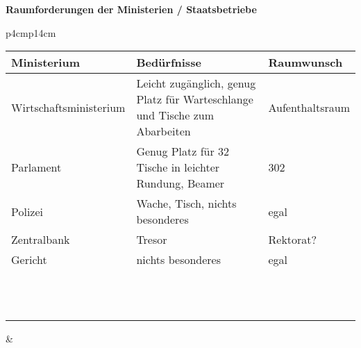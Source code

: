 \documentclass[12pt]{article}
\begin{document}
\textbf{\LARGE{Raumforderungen der Ministerien / Staatsbetriebe}}

\renewcommand{\arraystretch}{1.5}

\vspace{5mm}
\begin{tabular}{p{4cm}p{14cm}}
    \begin{tabular}{|p{}|p{}|p{}|}
        \hline
        \textbf{Ministerium} & \textbf{Bedürfnisse} & \textbf{Raumwunsch} \\ \hline
        Wirtschaftsministerium & Leicht zugänglich, genug Platz für Warteschlange und Tische
        zum Abarbeiten & Aufenthaltsraum \\ \hline
        Parlament & Genug Platz für 32 Tische in leichter Rundung, Beamer & 302 \\ \hline
        Polizei & Wache, Tisch, nichts besonderes & egal \\ \hline
        Zentralbank & Tresor & Rektorat? \\ \hline
        Gericht & nichts besonderes & egal \\ \hline
        & & \\ \hline
        & & \\ \hline
        & & \\ \hline
        & & \\ \hline
        & & \\ \hline
        & & \\ \hline
        & & \\ \hline
        & & \\ \hline
        & & \\ \hline
        & & \\ \hline
        & & \\ \hline
        & & \\ \hline
    \end{tabular} & \\
\end{tabular}
\end{document}
